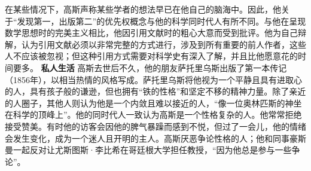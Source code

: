 在某些情况下，高斯声称某些学者的想法早已在他自己的脑海中。因此，他关于“发现第一，出版第二”的优先权概念与他的科学同时代人有所不同。与他在呈现数学思想时的完美主义相比，他因引用文献时的粗心大意而受到批评。他为自己辩解，认为引用文献必须以非常完整的方式进行，涉及到所有重要的前人作者，这些人不应该被忽视；但这种引用方式需要对科学史有深入了解，并且比他愿意花的时间要多。
\textbf{私人生活}  
高斯去世后不久，他的朋友萨托里乌斯出版了第一本传记（1856年），以相当热情的风格写成。萨托里乌斯将他视为一个平静且具有进取心的人，具有孩子般的谦逊，但也拥有“铁的性格”和坚定不移的精神力量。除了亲近的人圈子，其他人则认为他是一个内敛且难以接近的人，“像一位奥林匹斯的神坐在科学的顶峰上”。他的同时代人一致认为高斯是一个性格复杂的人。他常常拒绝接受赞美。有时他的访客会因他的脾气暴躁而感到不悦，但过了一会儿，他的情绪会发生变化，成为一个迷人且开明的主人。高斯厌恶争论性格的人；他和同事豪斯曼一起反对让尤斯图斯·李比希在哥廷根大学担任教授，“因为他总是参与一些争论”。